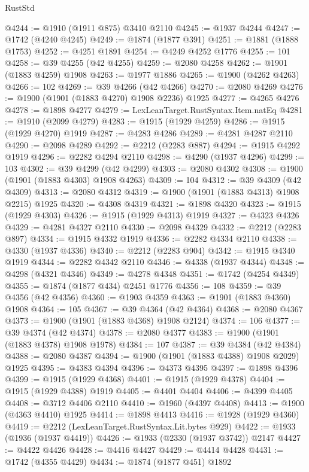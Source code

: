 \begin{lexlean}{RustStd}
\begin{coremodule}
{\begin{coremodule}
{{{{{{{{{{{{{{{{{{{{{{{{{{{{{{{{{{{{{{{{{{{@4244 := @1910 (@1911 @875) @3410 @2110
@4245 := @1937 @4244
@4247 := @1742 (@4240 @4245)
@4249 := @1874 (@1877 @391)
@4251 := @1881 (@1888 @1753)
@4252 := @4251 @1891
@4254 := @4249 @4252 @1776
@4255 := 101
@4258 := @39 @4255 (@42 @4255)
@4259 := @2080 @4258
@4262 := @1901 (@1883 @4259) @1908
@4263 := @1977 @1886
@4265 := @1900 (@4262 @4263)
@4266 := 102
@4269 := @39 @4266 (@42 @4266)
@4270 := @2080 @4269
@4276 := @1900 (@1901 (@1883 @4270) @1908 @2236) @1925
@4277 := @4265 @4276
@4278 := @1898 @4277
@4279 := LexLeanTarget.RustSyntax.Item.natEq
@4281 := @1910 (@2099 @4279)
@4283 := @1915 (@1929 @4259)
@4286 := @1915 (@1929 @4270) @1919
@4287 := @4283 @4286
@4289 := @4281 @4287 @2110
@4290 := @2098 @4289
@4292 := @2212 (@2283 @887)
@4294 := @1915 @4292 @1919
@4296 := @2282 @4294 @2110
@4298 := @4290 (@1937 @4296)
@4299 := 103
@4302 := @39 @4299 (@42 @4299)
@4303 := @2080 @4302
@4308 := @1900 (@1901 (@1883 @4303) @1908 @4263)
@4309 := 104
@4312 := @39 @4309 (@42 @4309)
@4313 := @2080 @4312
@4319 := @1900 (@1901 (@1883 @4313) @1908 @2215) @1925
@4320 := @4308 @4319
@4321 := @1898 @4320
@4323 := @1915 (@1929 @4303)
@4326 := @1915 (@1929 @4313) @1919
@4327 := @4323 @4326
@4329 := @4281 @4327 @2110
@4330 := @2098 @4329
@4332 := @2212 (@2283 @897)
@4334 := @1915 @4332 @1919
@4336 := @2282 @4334 @2110
@4338 := @4330 (@1937 @4336)
@4340 := @2212 (@2283 @904)
@4342 := @1915 @4340 @1919
@4344 := @2282 @4342 @2110
@4346 := @4338 (@1937 @4344)
@4348 := @4298 (@4321 @4346)
@4349 := @4278 @4348
@4351 := @1742 (@4254 @4349)
@4355 := @1874 (@1877 @434) @2451 @1776
@4356 := 108
@4359 := @39 @4356 (@42 @4356)
@4360 := @1903 @4359
@4363 := @1901 (@1883 @4360) @1908
@4364 := 105
@4367 := @39 @4364 (@42 @4364)
@4368 := @2080 @4367
@4373 := @1900 (@1901 (@1883 @4368) @1908 @2124)
@4374 := 106
@4377 := @39 @4374 (@42 @4374)
@4378 := @2080 @4377
@4383 := @1900 (@1901 (@1883 @4378) @1908 @1978)
@4384 := 107
@4387 := @39 @4384 (@42 @4384)
@4388 := @2080 @4387
@4394 := @1900 (@1901 (@1883 @4388) @1908 @2029) @1925
@4395 := @4383 @4394
@4396 := @4373 @4395
@4397 := @1898 @4396
@4399 := @1915 (@1929 @4368)
@4401 := @1915 (@1929 @4378)
@4404 := @1915 (@1929 @4388) @1919
@4405 := @4401 @4404
@4406 := @4399 @4405
@4408 := @3712 @4406 @2110
@4410 := @1960 (@4397 @4408)
@4413 := @1900 (@4363 @4410) @1925
@4414 := @1898 @4413
@4416 := @1928 (@1929 @4360)
@4419 := @2212 (LexLeanTarget.RustSyntax.Lit.bytes @929)
@4422 := @1933 (@1936 (@1937 @4419))
@4426 := @1933 (@2330 (@1937 @3742)) @2147
@4427 := @4422 @4426
@4428 := @4416 @4427
@4429 := @4414 @4428
@4431 := @1742 (@4355 @4429)
@4434 := @1874 (@1877 @451) @1892
}}}}}}}}}}}}}}}}}}}}}}}}}}}}}}}}}}}}}}}}}}}
\end{coremodule}}
\end{coremodule}
\end{lexlean}
